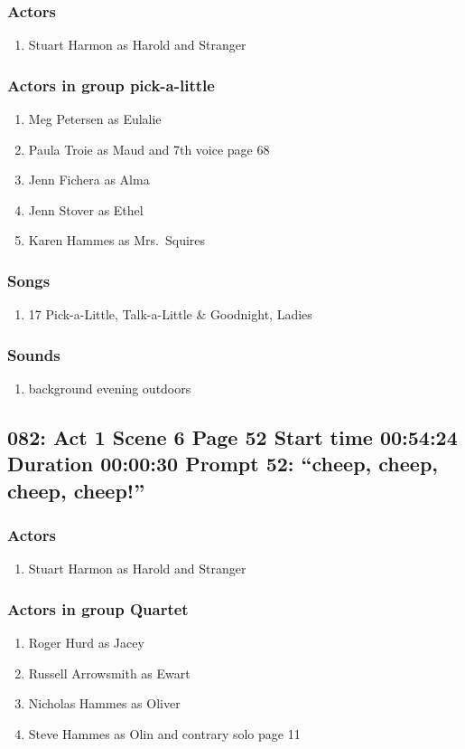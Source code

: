 \subsubsection{Actors}
\begin{enumerate}
\item Stuart Harmon as Harold and Stranger
\end{enumerate}
\subsubsection{Actors in group pick-a-little}
\begin{enumerate}
\item Meg Petersen as Eulalie
\item Paula Troie as Maud and 7th voice page 68
\item Jenn Fichera as Alma
\item Jenn Stover as Ethel
\item Karen Hammes as Mrs.~Squires
\end{enumerate}

\subsubsection{Songs}
\begin{enumerate}
\item 17 Pick-a-Little, Talk-a-Little \& Goodnight, Ladies
\end{enumerate}\subsubsection{Sounds}
\begin{enumerate}
\item background evening outdoors
\end{enumerate}
\subsection{082: Act 1 Scene 6 Page 52 Start time 00:54:24 Duration 00:00:30 Prompt 52: ``cheep, cheep, cheep, cheep!''}

\subsubsection{Actors}
\begin{enumerate}
\item Stuart Harmon as Harold and Stranger
\end{enumerate}
\subsubsection{Actors in group Quartet}
\begin{enumerate}
\item Roger Hurd as Jacey
\item Russell Arrowsmith as Ewart
\item Nicholas Hammes as Oliver
\item Steve Hammes as Olin and contrary solo page 11
\end{enumerate}
